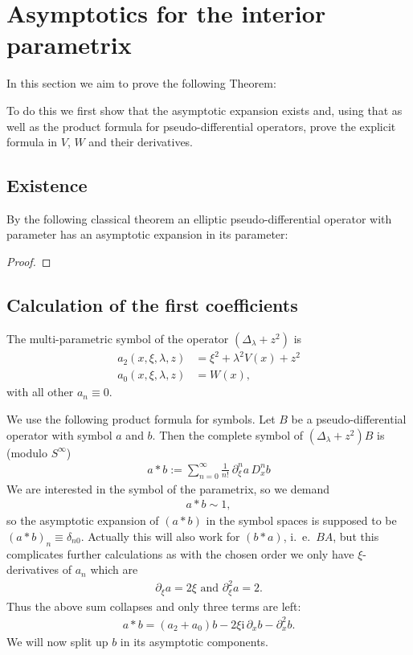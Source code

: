 \section{Asymptotics for the interior parametrix}
In this section we aim to prove the following Theorem:

To do this we first show that the asymptotic expansion exists and, using that as
well as the product formula for pseudo-differential operators, prove the
explicit formula in $V$, $W$ and their derivatives.
\subsection{Existence}
By the following classical theorem an elliptic pseudo-differential operator with
parameter has an asymptotic expansion in its parameter:

\begin{proof}
\end{proof}

\subsection{Calculation of the first coefficients}
The multi-parametric symbol of the operator $(\Delta_\lambda + z^2)$ is
\begin{align}
    a_2(x,\xi,\lambda,z) &= \xi^2 + \lambda^2 V(x) + z^2 \\
    a_0(x,\xi,\lambda,z) &= W(x),
    \label{eqn:symbol}
\end{align}
with all other $a_n \equiv 0$.

We use the following product formula for symbols. Let $B$ be a
pseudo-differential operator with symbol $a$ and $b$. Then the complete symbol
of $(\Delta_\lambda + z^2)B$ is (modulo $S^\infty$)
\begin{align}
  a * b := \sum_{n=0}^{\infty} \frac{1}{n!}\ \partial_\xi^n a\,D_x^n b
  \label{eqn:product-formula}
\end{align}
We are interested in the symbol of the parametrix, so we demand
\begin{align*}
  a * b \sim 1,
\end{align*}
so the asymptotic expansion of $(a*b)$ in the symbol spaces is supposed to be
$(a * b)_n \equiv \delta_{n0}$. Actually this will also work for $(b * a)$,
i.~e.\ $BA$, but this complicates further calculations as with the chosen order
we only have $\xi$-derivatives of $a_n$ which are
\begin{align}
  \partial_{\xi} a = 2\xi \text{ and } \partial_{\xi}^2 a = 2.
\end{align}
Thus the above sum collapses and only three terms are left:
\begin{align}
  a * b = (a_2 + a_0)b - 2\xi\mathrm i\,\partial_x b - \partial_x^2 b.
\end{align}
We will now split up $b$ in its asymptotic components.

